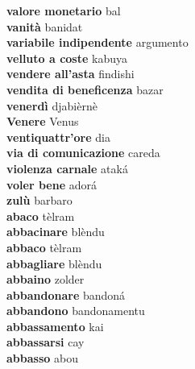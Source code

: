 \textbf{ valore monetario  } bal \\
\textbf{ vanità  } banidat \\
\textbf{ variabile indipendente  } argumento \\
\textbf{ velluto a coste  } kabuya \\
\textbf{ vendere all’asta  } findishi \\
\textbf{ vendita di beneficenza  } bazar \\
\textbf{ venerdì  } djabièrnè \\
\textbf{ Venere  } Venus \\
\textbf{ ventiquattr’ore  } dia \\
\textbf{ via di comunicazione  } careda \\
\textbf{ violenza carnale  } ataká \\
\textbf{ voler bene  } adorá \\
\textbf{ zulù  } barbaro \\
\textbf{abaco } tèlram \\
\textbf{abbacinare } blèndu \\
\textbf{abbaco } tèlram \\
\textbf{abbagliare } blèndu \\
\textbf{abbaino } zolder \\
\textbf{abbandonare } bandoná \\
\textbf{abbandono } bandonamentu \\
\textbf{abbassamento } kai \\
\textbf{abbassarsi } cay \\
\textbf{abbasso } abou \\
